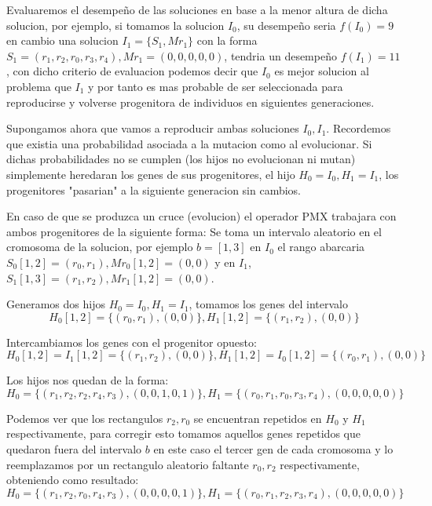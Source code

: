 \documentclass[10pt]{article}
\begin{document}

Evaluaremos el desempeño de las soluciones en base a la menor altura de dicha solucion, por ejemplo, si tomamos la solucion $I_0$, su desempeño seria $f(I_0) = 9$ en cambio una solucion $I_1 = \{S_1,Mr_1\}$ con la forma $S_1 = (r_1,r_2,r_0,r_3,r_4), Mr_1 = (0,0,0,0,0)$, tendria un desempeño $f(I_1) = 11$, con dicho criterio de evaluacion podemos decir que $I_0$ es mejor solucion al problema que $I_1$ y por tanto es mas probable de ser seleccionada para reproducirse y volverse progenitora de individuos en siguientes generaciones.


Supongamos ahora que vamos a reproducir ambas soluciones $I_0,I_1$. Recordemos que existia una probabilidad asociada a la mutacion como al evolucionar. Si dichas probabilidades no se cumplen (los hijos no evolucionan ni mutan) simplemente heredaran los genes de sus progenitores, el hijo $H_0 = I_0, H_1 = I_1$, los progenitores "pasarian" a la siguiente generacion sin cambios.

En caso de que se produzca un cruce (evolucion) el operador PMX trabajara con ambos progenitores de la siguiente forma: 
Se toma un intervalo aleatorio en el cromosoma de la solucion, por ejemplo $b = [1,3]$ en $I_0$ el rango abarcaria $S_0[1,2] = (r_0,r_1), Mr_0[1,2] = (0,0)$ y en $I_1$, $S_1[1,3] = (r_1,r_2), Mr_1[1,2] = (0,0)$.

Generamos dos hijos $H_0 = I_0, H_1 = I_1$, tomamos los genes del intervalo
$$H_0[1,2] = \{(r_0,r_1),(0,0)\}, H_1[1,2] = \{(r_1,r_2),(0,0)\}$$

Intercambiamos los genes con el progenitor opuesto:
$$H_0[1,2] = I_1[1,2] = \{(r_1,r_2),(0,0)\}, H_1[1,2] = I_0[1,2] = \{(r_0,r_1),(0,0)\}$$ 

Los hijos nos quedan de la forma: 
$$H_0=\{(r_1,r_2,r_2,r_4,r_3),(0,0,1,0,1)\}, H_1 = \{(r_0,r_1,r_0,r_3,r_4),(0,0,0,0,0)\}$$

Podemos ver que los rectangulos $r_2, r_0$ se encuentran repetidos en $H_0$ y $H_1$ respectivamente, para corregir esto tomamos aquellos genes repetidos que quedaron fuera del intervalo $b$ en este caso el tercer gen de cada cromosoma y lo reemplazamos por un rectangulo aleatorio faltante $r_0, r_2$ respectivamente, obteniendo como resultado:
$$H_0=\{(r_1,r_2,r_0,r_4,r_3),(0,0,0,0,1)\}, H_1 = \{(r_0,r_1,r_2,r_3,r_4),(0,0,0,0,0)\}$$
\end{document}
